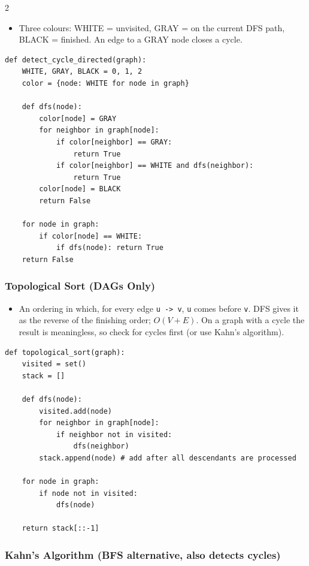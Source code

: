 \documentclass[9pt,a4paper]{extarticle}
\begin{document}
\begin{multicols}{2}
\begin{itemize}
\item Three colours: WHITE = unvisited, GRAY = on the current DFS path, BLACK = finished. An edge to a GRAY node closes a cycle.
\end{itemize}

\begin{lstlisting}
def detect_cycle_directed(graph):
    WHITE, GRAY, BLACK = 0, 1, 2
    color = {node: WHITE for node in graph}

    def dfs(node):
        color[node] = GRAY
        for neighbor in graph[node]:
            if color[neighbor] == GRAY:
                return True
            if color[neighbor] == WHITE and dfs(neighbor):
                return True
        color[node] = BLACK
        return False

    for node in graph:
        if color[node] == WHITE:
            if dfs(node): return True
    return False
\end{lstlisting}

\subsubsection{Topological Sort (DAGs Only)}

\begin{itemize}
\item An ordering in which, for every edge \texttt{u -> v}, \texttt{u} comes before \texttt{v}. DFS gives it as the reverse of the finishing order; $O(V+E)$. On a graph with a cycle the result is meaningless, so check for cycles first (or use Kahn's algorithm).
\end{itemize}

\begin{lstlisting}
def topological_sort(graph):
    visited = set()
    stack = []

    def dfs(node):
        visited.add(node)
        for neighbor in graph[node]:
            if neighbor not in visited:
                dfs(neighbor)
        stack.append(node) # add after all descendants are processed

    for node in graph:
        if node not in visited:
            dfs(node)

    return stack[::-1]
\end{lstlisting}

\subsubsection{Kahn's Algorithm (BFS alternative, also detects cycles)}


\end{multicols}
\end{document}

